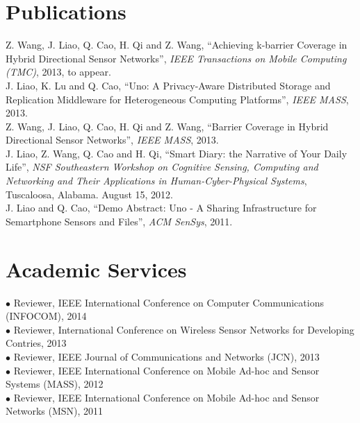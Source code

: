 \documentclass[margin, centered]{resume}
\begin{document}
\begin{resume}
    \section{\mysidestyle Publications}
    Z. Wang, J. Liao, Q. Cao, H. Qi and Z. Wang, ``Achieving k-barrier Coverage in Hybrid Directional Sensor Networks'', \emph{IEEE Transactions on Mobile Computing (TMC)}, 2013, to appear. \vspace{2mm} \\
    J. Liao, K. Lu and Q. Cao, ``Uno: A Privacy-Aware Distributed Storage and Replication Middleware for Heterogeneous Computing Platforms'', \emph{IEEE MASS}, 2013. \vspace{2mm} \\
    Z. Wang, J. Liao, Q. Cao, H. Qi and Z. Wang, ``Barrier Coverage in Hybrid Directional Sensor Networks'', \emph{IEEE MASS}, 2013.\vspace{2mm} \\
    J. Liao, Z. Wang, Q. Cao and H. Qi, ``Smart Diary: the Narrative of Your Daily Life'', \emph{NSF Southeastern Workshop on Cognitive Sensing, Computing and Networking and Their Applications in Human-Cyber-Physical Systems}, Tuscaloosa, Alabama. August 15, 2012. \vspace{2mm} \\
    J. Liao and Q. Cao, ``Demo Abstract: Uno - A Sharing Infrastructure for Semartphone Sensors and Files'', \emph{ACM SenSys}, 2011.\\ \vspace{-5mm}
    
    \section{\mysidestyle Academic Services}
    $\bullet$ Reviewer, IEEE International Conference on Computer Communications (INFOCOM), \hfill 2014\\
    $\bullet$ Reviewer, International Conference on Wireless Sensor Networks for Developing Contries, \hfill 2013\\
    $\bullet$ Reviewer, IEEE Journal of Communications and Networks (JCN), \hfill 2013\\
    $\bullet$ Reviewer, IEEE International Conference on Mobile Ad-hoc and Sensor Systems (MASS), \hfill 2012\\
    $\bullet$ Reviewer, IEEE International Conference on Mobile Ad-hoc and Sensor Networks (MSN), \hfill 2011\\ \vspace{-5mm}
	

\end{resume}
\end{document}
